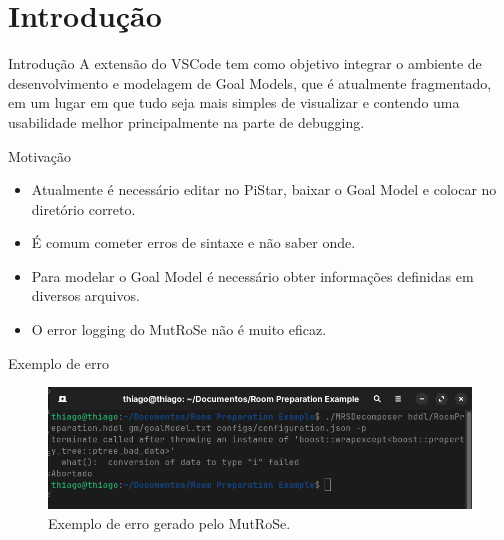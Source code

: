 \documentclass{beamer}
\begin{document}
    


\section{Introdução}
\begin{frame}{Introdução}
  A extensão do VSCode tem como objetivo integrar o ambiente de desenvolvimento e modelagem de Goal Models, 
  que é atualmente fragmentado, em um lugar em que tudo seja mais simples de visualizar e contendo uma usabilidade melhor 
  principalmente na parte de debugging.
\end{frame}



\begin{frame}{Motivação}
    \begin{itemize}
    \item Atualmente é necessário editar no PiStar, baixar o Goal Model e colocar no diretório correto.
    \item É comum cometer erros de sintaxe e não saber onde.
    \item Para modelar o Goal Model é necessário obter informações definidas em diversos arquivos.
    \item O error logging do MutRoSe não é muito eficaz.
  \end{itemize}
\end{frame}
\begin{frame}{Exemplo de erro}
  \begin{figure}[!h]
    \centering
    \includegraphics[width=1\textwidth]{erro_mutrose.png} 
    \caption{Exemplo de erro gerado pelo MutRoSe.}
  \end{figure}
\end{frame}
\end{document}
